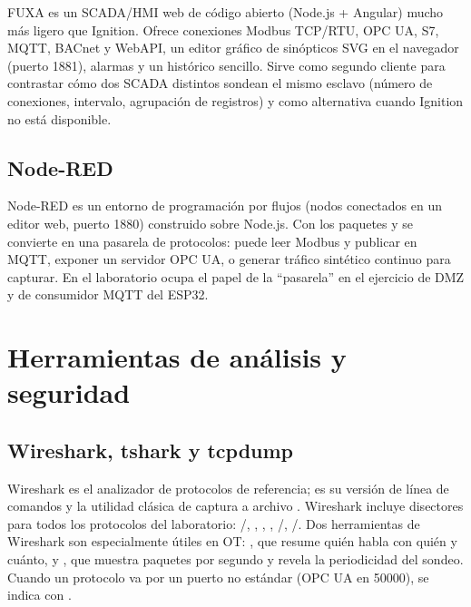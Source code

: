 FUXA es un SCADA/HMI web de código abierto (Node.js + Angular) mucho más ligero que Ignition. Ofrece conexiones Modbus TCP/RTU, OPC UA, S7, MQTT, BACnet y WebAPI, un editor gráfico de sinópticos SVG en el navegador (puerto 1881), alarmas y un histórico sencillo. Sirve como segundo cliente para contrastar cómo dos SCADA distintos sondean el mismo esclavo (número de conexiones, intervalo, agrupación de registros) y como alternativa cuando Ignition no está disponible.

\subsection{Node-RED}

Node-RED es un entorno de programación por flujos (nodos conectados en un editor web, puerto 1880) construido sobre Node.js. Con los paquetes  y  se convierte en una pasarela de protocolos: puede leer Modbus y publicar en MQTT, exponer un servidor OPC UA, o generar tráfico sintético continuo para capturar. En el laboratorio ocupa el papel de la ``pasarela'' en el ejercicio de DMZ y de consumidor MQTT del ESP32.

\section{Herramientas de análisis y seguridad}
\label{sec:analisis}

\subsection{Wireshark, tshark y tcpdump}

Wireshark es el analizador de protocolos de referencia;  es su versión de línea de comandos y  la utilidad clásica de captura a archivo . Wireshark incluye disectores para todos los protocolos del laboratorio: /, , , , /, /. Dos herramientas de Wireshark son especialmente útiles en OT: , que resume quién habla con quién y cuánto, y , que muestra paquetes por segundo y revela la periodicidad del sondeo. Cuando un protocolo va por un puerto no estándar (OPC UA en 50000), se indica con .

